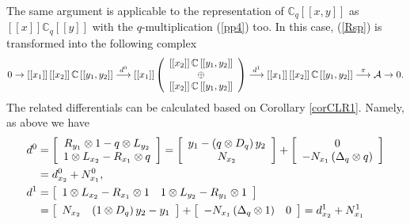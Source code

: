 \documentclass[12pt,reqno]{amsart}%
\theoremstyle{plain}
\numberwithin{theorem}{section} \numberwithin{equation}{section}
\numberwithin{lemma}{section}
\numberwithin{remark}{section}
\numberwithin{example}{section}
\numberwithin{proposition}{section}
\numberwithin{definition}{section}
\numberwithin{corollary}{section}
\begin{document}
The same argument is applicable to the representation of $\mathbb{C}%
_{q}\left[  \left[  x,y\right]  \right]  $ as $\left[  \left[  x\right]
\right]  \mathbb{C}_{q}\left[  \left[  y\right]  \right]  $ with the
$q$-multiplication (\ref{pp4}) too. In this case, (\ref{Rsp}) is transformed
into the following complex
\[
0\rightarrow\left[  \left[  x_{1}\right]  \right]  \left[  \left[
x_{2}\right]  \right]  \mathbb{C}\left[  \left[  y_{1},y_{2}\right]  \right]
\overset{d^{0}}{\longrightarrow}\left[  \left[  x_{1}\right]  \right]  \left(
%
\begin{array}
[c]{c}%
\left[  \left[  x_{2}\right]  \right]  \mathbb{C}\left[  \left[  y_{1}%
,y_{2}\right]  \right] \\
\oplus\\
\left[  \left[  x_{2}\right]  \right]  \mathbb{C}\left[  \left[  y_{1}%
,y_{2}\right]  \right]
\end{array}
\right)  \overset{d^{1}}{\longrightarrow}\left[  \left[  x_{1}\right]
\right]  \left[  \left[  x_{2}\right]  \right]  \mathbb{C}\left[  \left[
y_{1},y_{2}\right]  \right]  \overset{\pi}{\longrightarrow}\mathcal{A}%
\rightarrow0.
\]
The related differentials can be calculated based on Corollary \ref{corCLR1}.
Namely, as above we have%
\begin{align*}
d^{0}  &  =\left[
\begin{array}
[c]{c}%
R_{y_{1}}\otimes1-q\otimes L_{y_{2}}\\
1\otimes L_{x_{2}}-R_{x_{1}}\otimes q
\end{array}
\right]  =\left[
\begin{array}
[c]{c}%
y_{1}-\left(  q\otimes D_{q}\right)  y_{2}\\
N_{x_{2}}%
\end{array}
\right]  +\left[
\begin{array}
[c]{c}%
0\\
-N_{x_{1}}\left(  \Delta_{q}\otimes q\right)
\end{array}
\right] \\
&  =d_{x_{2}}^{0}+N_{x_{1}}^{0},\\
d^{1}  &  =\left[
\begin{array}
[c]{cc}%
1\otimes L_{x_{2}}-R_{x_{1}}\otimes1 & 1\otimes L_{y_{2}}-R_{y_{1}}\otimes1
\end{array}
\right] \\
&  =\left[
\begin{array}
[c]{cc}%
N_{x_{2}} & \left(  1\otimes D_{q}\right)  y_{2}-y_{1}%
\end{array}
\right]  +\left[
\begin{array}
[c]{cc}%
-N_{x_{1}}\left(  \Delta_{q}\otimes1\right)  & 0
\end{array}
\right]  =d_{x_{2}}^{1}+N_{x_{1}}^{1}%
\end{align*}
\end{document}

